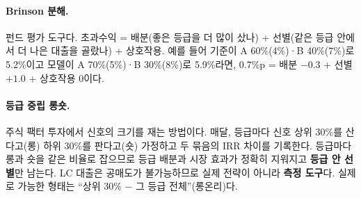 \paragraph{Brinson 분해.} 펀드 평가 도구다. 초과수익 = 배분(좋은 등급을 더 많이 샀나) + 선별(같은 등급 안에서 더 나은 대출을 골랐나) + 상호작용. 예를 들어 기준이 A 60\%(4\%)·\allowbreak{}B 40\%(7\%)로 5.2\%이고 모델이 A 70\%(5\%)·\allowbreak{}B 30\%(8\%)로 5.9\%라면, 0.7\%p = 배분 $-0.3$ + 선별 $+1.0$ + 상호작용 0이다.

\paragraph{등급 중립 롱숏.} 주식 팩터 투자에서 신호의 크기를 재는 방법이다. 매달, 등급마다 신호 상위 30\%를 산다고(롱) 하위 30\%를 판다고(숏) 가정하고 두 묶음의 IRR 차이를 기록한다. 등급마다 롱과 숏을 같은 비율로 잡으므로 등급 배분과 시장 효과가 정확히 지워지고 \textbf{등급 안 선별}만 남는다. LC 대출은 공매도가 불가능하므로 실제 전략이 아니라 \textbf{측정 도구}다. 실제로 가능한 형태는 ``상위 30\% $-$ 그 등급 전체''(롱온리)다.
